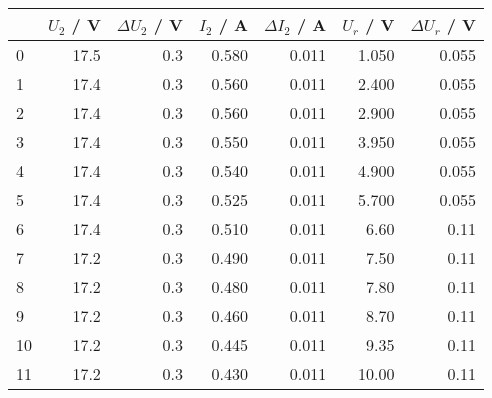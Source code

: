 \begin{tabular}{lrrrrrr}
	\toprule
	{} & $U_2$ / \si{\volt} & $\Delta U_2$ / \si{\volt} & $I_2$ / \si{\ampere} & $\Delta I_2$ / \si{\ampere} & $U_r$ / \si{\volt} & $\Delta U_r$ / \si{\volt} \\
	\midrule
	0  & 17.5               & 0.3                       & 0.580                & 0.011                       & 1.050              & 0.055                     \\
	1  & 17.4               & 0.3                       & 0.560                & 0.011                       & 2.400              & 0.055                     \\
	2  & 17.4               & 0.3                       & 0.560                & 0.011                       & 2.900              & 0.055                     \\
	3  & 17.4               & 0.3                       & 0.550                & 0.011                       & 3.950              & 0.055                     \\
	4  & 17.4               & 0.3                       & 0.540                & 0.011                       & 4.900              & 0.055                     \\
	5  & 17.4               & 0.3                       & 0.525                & 0.011                       & 5.700              & 0.055                     \\
	6  & 17.4               & 0.3                       & 0.510                & 0.011                       & 6.60               & 0.11                      \\
	7  & 17.2               & 0.3                       & 0.490                & 0.011                       & 7.50               & 0.11                      \\
	8  & 17.2               & 0.3                       & 0.480                & 0.011                       & 7.80               & 0.11                      \\
	9  & 17.2               & 0.3                       & 0.460                & 0.011                       & 8.70               & 0.11                      \\
	10 & 17.2               & 0.3                       & 0.445                & 0.011                       & 9.35               & 0.11                      \\
	11 & 17.2               & 0.3                       & 0.430                & 0.011                       & 10.00              & 0.11                      \\

\end{tabular}
